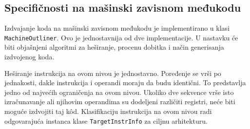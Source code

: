 \documentclass[12pt,oneside]{memoir}
\begin{document}





\subsection{Specifičnosti na mašinski zavisnom međukodu}


Izdvajanje koda na mašinski zavisnom međukodu je implementirano u klasi \verb|MachineOutliner|.
Ovo je jednostavnija od dve implementacije.
U nastavku će biti objašnjeni algoritmi za heširanje, procenu dobitka i način generisanja izdvojenog koda.

Heširanje instrukcija na ovom nivou je jednostavno.
Poređenje se vrši po jednakosti, dakle instrukcija i operandi moraju da budu identični.
To predstavlja jedno od najvećih ograničenja na ovom nivou.
Ukoliko dve sekvence vrše isto izračunavanje ali njihovim operandima su dodeljeni različiti registri, neće biti moguće izdvojiti taj k\^od.
Klasifikaciju instrukcija na ovom nivou radi odgovarajuća instanca klase \verb|TargetInstrInfo| za ciljnu arhitekturu.
\end{document}
